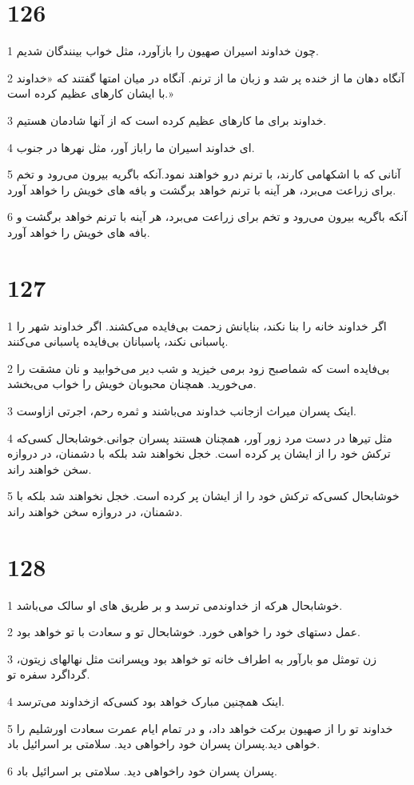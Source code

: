 \chapter{126}

\par 1 چون خداوند اسیران صهیون را بازآورد، مثل خواب بینندگان شدیم.
\par 2 آنگاه دهان ما از خنده پر شد و زبان ما از ترنم. آنگاه در میان امتها گفتند که «خداوند با ایشان کارهای عظیم کرده است.»
\par 3 خداوند برای ما کارهای عظیم کرده است که از آنها شادمان هستیم.
\par 4 ‌ای خداوند اسیران ما راباز آور، مثل نهرها در جنوب.
\par 5 آنانی که با اشکهامی کارند، با ترنم درو خواهند نمود.آنکه باگریه بیرون می‌رود و تخم برای زراعت می‌برد، هر آینه با ترنم خواهد برگشت و بافه های خویش را خواهد آورد.
\par 6 آنکه باگریه بیرون می‌رود و تخم برای زراعت می‌برد، هر آینه با ترنم خواهد برگشت و بافه های خویش را خواهد آورد.
 
\chapter{127}

\par 1 اگر خداوند خانه را بنا نکند، بنایانش زحمت بی‌فایده می‌کشند. اگر خداوند شهر را پاسبانی نکند، پاسبانان بی‌فایده پاسبانی می‌کنند.
\par 2 بی‌فایده است که شماصبح زود برمی خیزید و شب دیر می‌خوابید و نان مشقت را می‌خورید. همچنان محبوبان خویش را خواب می‌بخشد.
\par 3 اینک پسران میراث ازجانب خداوند می‌باشند و ثمره رحم، اجرتی ازاوست.
\par 4 مثل تیرها در دست مرد زور آور، همچنان هستند پسران جوانی.خوشابحال کسی‌که ترکش خود را از ایشان پر کرده است. خجل نخواهند شد بلکه با دشمنان، در دروازه سخن خواهند راند.
\par 5 خوشابحال کسی‌که ترکش خود را از ایشان پر کرده است. خجل نخواهند شد بلکه با دشمنان، در دروازه سخن خواهند راند.
 
\chapter{128}

\par 1 خوشابحال هر‌که از خداوندمی ترسد و بر طریق های او سالک می‌باشد.
\par 2 عمل دستهای خود را خواهی خورد. خوشابحال تو و سعادت با تو خواهد بود.
\par 3 زن تومثل مو بارآور به اطراف خانه تو خواهد بود وپسرانت مثل نهالهای زیتون، گرداگرد سفره تو.
\par 4 اینک همچنین مبارک خواهد بود کسی‌که ازخداوند می‌ترسد.
\par 5 خداوند تو را از صهیون برکت خواهد داد، و در تمام ایام عمرت سعادت اورشلیم را خواهی دید.پسران پسران خود راخواهی دید. سلامتی بر اسرائیل باد.
\par 6 پسران پسران خود راخواهی دید. سلامتی بر اسرائیل باد.
 
